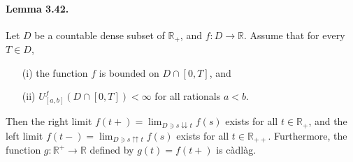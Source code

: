 \documentclass{article}
\numberwithin{equation}{section}
\theoremstyle{plain}
\theoremstyle{definition}
\begin{document}
\paragraph{Lemma 3.42.\label{lemma:3.42}} Let $D$ be a countable dense subset of $\mathbb{R}_+$, and $f:D\to\mathbb{R}$. Assume that for every $T\in D$, 
\begin{itemize}
	\item[(i)] the function $f$ is bounded on $D\cap[0,T]$, and 
	\item[(ii)] $U_{[a,b]}^f(D\cap[0,T])<\infty$ for all rationals $a<b$.\vspace{0.05cm}
\end{itemize} 
Then the right limit $f(t+)=\lim_{D\ni s\downdownarrows t}f(s)$ exists for all $t\in\mathbb{R}_+$, and the left limit $f(t-)=\lim_{D\ni s\upuparrows t}f(s)$ exists for all $t\in\mathbb{R}_{++}$. Furthermore, the function $g:\mathbb{R}^+\to\mathbb{R}$ defined by $g(t)=f(t+)$ is càdlàg.
\end{document}
